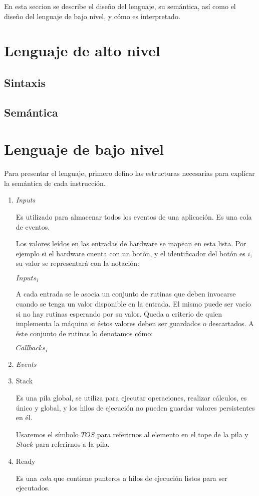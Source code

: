 En esta seccion se describe el diseño del lenguaje, su semántica,
así como el diseño del lenguaje de bajo nivel, y cómo es interpretado.

\section{Lenguaje de alto nivel}

\subsection{Sintaxis}

\subsection{Semántica}

\section{Lenguaje de bajo nivel}

 Para presentar el lenguaje, primero defino las estructuras
necesarias para explicar la semántica de cada instrucción.

\begin{enumerate}

\item \emph{Inputs}

  
  Es utilizado para almacenar todos los eventos de una aplicación.
  Es una cola de eventos.

  

  Los valores leídos en las entradas de hardware se mapean
en esta lista. Por ejemplo si el hardware cuenta con un botón,
y el identificador del botón es $i$,
su valor se representará con la notación:

  $Inputs_i$

  A cada entrada se le asocia un conjunto de
rutinas que deben invocarse cuando se tenga un
valor disponible en la entrada. El mismo puede ser vacío si
no hay rutinas esperando por su valor. Queda a criterio de quien
implementa la máquina si éstos valores deben ser guardados o
descartados. 
  A éste conjunto de rutinas lo denotamos cómo:

  $Callbacks_i$

\item \emph{Events}


\item Stack

Es una pila global, se utiliza para ejecutar operaciones,
realizar cálculos, es único
y global, y los hilos de ejecución no pueden guardar valores
persistentes en él.

Usaremos el símbolo $TOS$ para referirnos al elemento en el tope
de la pila y $Stack$ para referirnos a la pila.

\item Ready

Es una \emph{cola} que contiene punteros a hilos de ejecución
listos para ser ejecutados.

\end{enumerate}

